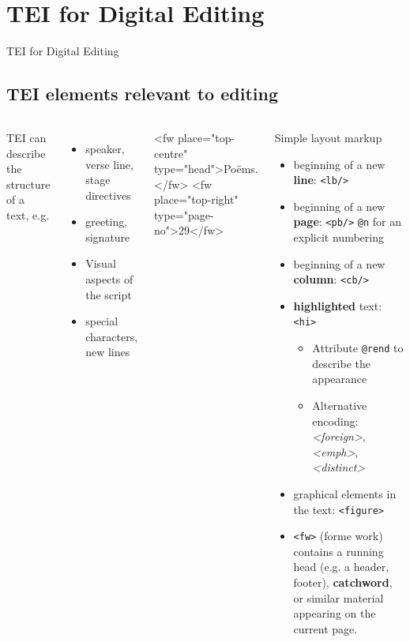 \section{TEI for Digital Editing}
\begin{frame}{TEI for Digital Editing}

\subsection{TEI elements relevant to editing}
\small

\begin{columns}
TEI can describe the structure of a text, e.g.
\begin{itemize}
\item  speaker, verse line, stage directives
\item  greeting, signature
\item  Visual aspects of the script
\item  special characters, new lines
\end{itemize}

\begin{xmlcode}
<fw place="top-centre" type="head">Poëms.</fw>
<fw place="top-right" type="page-no">29</fw>
\end{xmlcode}

\vspace{-3em}
\begin{block}{Simple layout markup}\footnotesize
\begin{itemize}
\item  beginning of a new \textbf{line}: \texttt{<lb/>}
\item  beginning of a new \textbf{page}: \texttt{<pb/>} \texttt{@n} for an explicit numbering
\item  beginning of a new \textbf{column}: \texttt{<cb/>}
\item  \textbf{highlighted} text: \texttt{<hi>}
\begin{itemize}\scriptsize
    \item Attribute \texttt{@rend} to describe the appearance
    \item Alternative encoding: \emph{<foreign>}, \emph{<emph>}, \emph{<distinct>}
\end{itemize}
\item  graphical elements in the text: \texttt{<figure>}
\item  \texttt{<fw>} (forme work) contains a running head (e.g.
a header, footer), \textbf{catchword}, or similar material
appearing on the current page.
\end{itemize}
\end{block}
\end{columns}



\end{frame}
